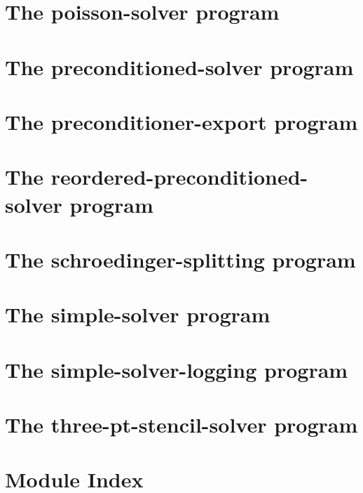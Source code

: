 \let\mypdfximage\pdfximage\def\pdfximage{\immediate\mypdfximage}\documentclass[twoside]{book}
\newcommand{\+}{\discretionary{\mbox{\scriptsize$\hookleftarrow$}}{}{}}
\begin{document}
\chapter{The poisson-\/solver program}
\label{poisson_solver}

\chapter{The preconditioned-\/solver program}
\label{preconditioned_solver}

\chapter{The preconditioner-\/export program}
\label{preconditioner_export}

\chapter{The reordered-\/preconditioned-\/solver program}
\label{reordered_preconditioned_solver}

\chapter{The schroedinger-\/splitting program}
\label{schroedinger_splitting}

\chapter{The simple-\/solver program}
\label{simple_solver}

\chapter{The simple-\/solver-\/logging program}
\label{simple_solver_logging}

\chapter{The three-\/pt-\/stencil-\/solver program}
\label{three_pt_stencil_solver}

\chapter{Module Index}

\end{document}
